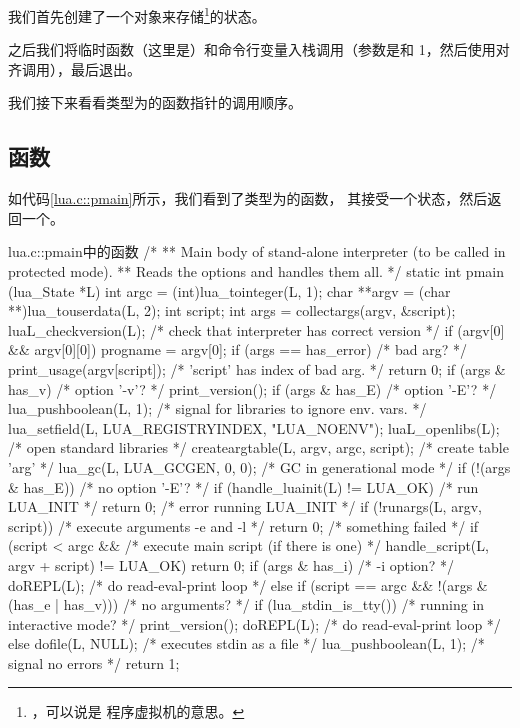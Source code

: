我们首先创建了一个对象来存储\footnote{，可以说是
程序虚拟机的意思。}的状态。

之后我们将临时函数（这里是）和命令行变量入栈调用（参数是和\cmd
{1}，然后使用对齐调用），最后退出。

我们接下来看看类型为的函数指针的调用顺序。


\subsection{函数}

如代码\ref{lua.c::pmain}所示，我们看到了类型为的函数，
其接受一个状态，然后返回一个。

\begin{ccode}{lua.c::pmain}{中的函数}
/*
** Main body of stand-alone interpreter (to be called in protected mode).
** Reads the options and handles them all.
*/
static int pmain (lua_State *L) {
  int argc = (int)lua_tointeger(L, 1);
  char **argv = (char **)lua_touserdata(L, 2);
  int script;
  int args = collectargs(argv, &script);
  luaL_checkversion(L);  /* check that interpreter has correct version */
  if (argv[0] && argv[0][0]) progname = argv[0];
  if (args == has_error) {  /* bad arg? */
    print_usage(argv[script]);  /* 'script' has index of bad arg. */
    return 0;
  }
  if (args & has_v)  /* option '-v'? */
    print_version();
  if (args & has_E) {  /* option '-E'? */
    lua_pushboolean(L, 1);  /* signal for libraries to ignore env. vars. */
    lua_setfield(L, LUA_REGISTRYINDEX, "LUA_NOENV");
  }
  luaL_openlibs(L);  /* open standard libraries */
  createargtable(L, argv, argc, script);  /* create table 'arg' */
  lua_gc(L, LUA_GCGEN, 0, 0);  /* GC in generational mode */
  if (!(args & has_E)) {  /* no option '-E'? */
    if (handle_luainit(L) != LUA_OK)  /* run LUA_INIT */
      return 0;  /* error running LUA_INIT */
  }
  if (!runargs(L, argv, script))  /* execute arguments -e and -l */
    return 0;  /* something failed */
  if (script < argc &&  /* execute main script (if there is one) */
      handle_script(L, argv + script) != LUA_OK)
    return 0;
  if (args & has_i)  /* -i option? */
    doREPL(L);  /* do read-eval-print loop */
  else if (script == argc && !(args & (has_e | has_v))) {  /* no arguments? */
    if (lua_stdin_is_tty()) {  /* running in interactive mode? */
      print_version();
      doREPL(L);  /* do read-eval-print loop */
    }
    else dofile(L, NULL);  /* executes stdin as a file */
  }
  lua_pushboolean(L, 1);  /* signal no errors */
  return 1;
}
\end{ccode}

